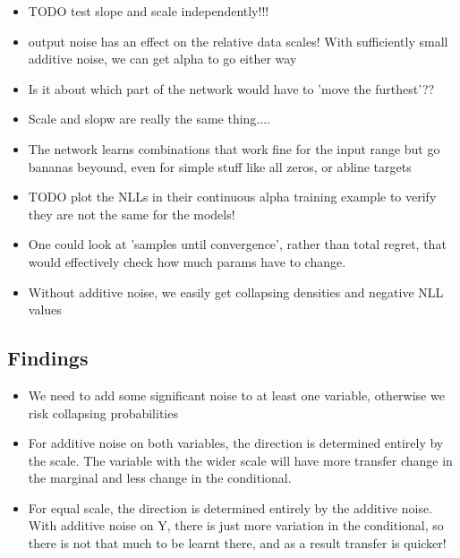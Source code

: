 \documentclass{article}
\begin{document}
\begin{itemize}
    \item TODO test slope and scale independently!!!
    \item output noise has an effect on the relative data scales! With sufficiently small additive noise, we can get alpha to go either way
    \item Is it about which part of the network would have to 'move the furthest'??
    \item Scale and slopw are really the same thing....
    \item The network learns combinations that work fine for the input range but go bananas beyound, even for simple stuff like all zeros, or abline targets
    \item TODO plot the NLLs in their continuous alpha training example to verify they are not the same for the models!
    \item One could look at 'samples until convergence', rather than total regret, that would effectively check how much params have to change.
    \item Without additive noise, we easily get collapsing densities and negative NLL values
\end{itemize}

\subsection{Findings}
\begin{itemize}
    \item We need to add some significant noise to at least one variable, otherwise we risk collapsing probabilities
    \item For additive noise on both variables, the direction is determined entirely by the scale. The variable with the wider scale will have more transfer change in the marginal and less change in the conditional.
    \item For equal scale, the direction is determined entirely by the additive noise. With additive noise on Y, there is just more variation in the conditional, so there is not that much to be learnt there, and as a result transfer is quicker!
\end{itemize}

\printbibliography
\end{document}
